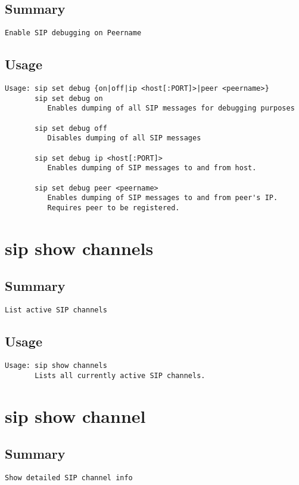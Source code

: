 \subsection{Summary}
\begin{verbatim}
Enable SIP debugging on Peername
\end{verbatim}
\subsection{Usage}
\begin{verbatim}
Usage: sip set debug {on|off|ip <host[:PORT]>|peer <peername>}
       sip set debug on
          Enables dumping of all SIP messages for debugging purposes

       sip set debug off
          Disables dumping of all SIP messages

       sip set debug ip <host[:PORT]>
          Enables dumping of SIP messages to and from host.

       sip set debug peer <peername>
          Enables dumping of SIP messages to and from peer's IP.
          Requires peer to be registered.

\end{verbatim}


\section{sip show channels}
\subsection{Summary}
\begin{verbatim}
List active SIP channels
\end{verbatim}
\subsection{Usage}
\begin{verbatim}
Usage: sip show channels
       Lists all currently active SIP channels.

\end{verbatim}


\section{sip show channel}
\subsection{Summary}
\begin{verbatim}
Show detailed SIP channel info
\end{verbatim}
